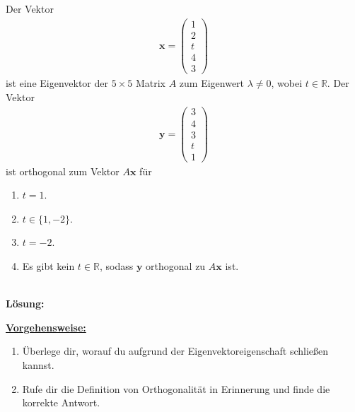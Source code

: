 \newpage

\subsection*{}
Der Vektor
\begin{align*}
\textbf{x}
=
\begin{pmatrix}
1\\
2\\
t\\
4\\
3
\end{pmatrix}
\end{align*}
ist eine Eigenvektor der $5 \times 5$ Matrix $A$ zum Eigenwert $\lambda \neq 0$, wobei $t \in \mathbb{R}$.
Der Vektor
\begin{align*}
\textbf{y}
= 
\begin{pmatrix}
3\\
4\\
3\\
t\\ 
1
\end{pmatrix}
\end{align*}
ist orthogonal zum Vektor $A \textbf{x}$ für
\renewcommand{\labelenumi}{(\alph{enumi})}
\begin{enumerate}
\item 
$t = 1$.
\item
$t \in \lbrace 1, -2 \rbrace$.
\item
$t = -2$.
\item
Es gibt kein $t \in \mathbb{R}$, sodass $\textbf{y}$ orthogonal zu $A \textbf{x} $ ist.
\end{enumerate}
\ \\
\textbf{Lösung:}
\begin{mdframed}
\underline{\textbf{Vorgehensweise:}}
\renewcommand{\labelenumi}{\theenumi.}
\begin{enumerate}
\item Überlege dir, worauf du aufgrund der Eigenvektoreigenschaft schließen kannst.
\item 
Rufe dir die Definition von Orthogonalität in Erinnerung und finde die korrekte Antwort.
\end{enumerate}
\end{mdframed}

